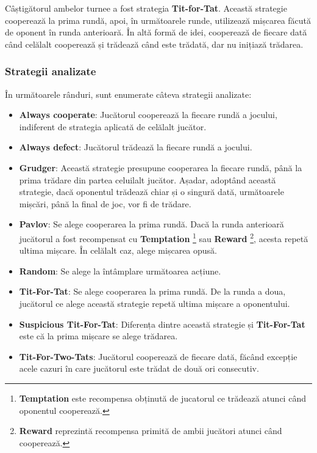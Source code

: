 Câștigătorul ambelor turnee a fost strategia \textbf{Tit-for-Tat}. Această strategie cooperează la prima rundă, apoi, în următoarele runde, utilizează mișcarea făcută de oponent în runda anterioară. În altă formă de idei, cooperează de fiecare dată când celălalt cooperează și trădează când este trădată, dar nu inițiază trădarea.

\clearpage

\subsubsection{Strategii analizate}

În următoarele rânduri, sunt enumerate câteva strategii analizate:

\begin{itemize}  
	\item \textbf{Always cooperate}: Jucătorul cooperează la fiecare rundă a jocului, indiferent de strategia aplicată de celălalt jucător. 
	\item \textbf{Always defect}: Jucătorul trădează la fiecare rundă a jocului. 
	\item \textbf{Grudger}: Această strategie presupune cooperarea la fiecare rundă, până la prima trădare din partea celuilalt jucător. Așadar, adoptând această strategie, dacă oponentul trădează chiar și o singură dată, următoarele mișcări, până la final de joc, vor fi de trădare. 
	\item \textbf{Pavlov}: Se alege cooperarea la prima rundă. Dacă la runda anterioară jucătorul a fost recompensat cu \textbf{Temptation} \footnote{\textbf{Temptation} este recompensa obținută de jucatorul ce trădează atunci când oponentul cooperează.} sau \textbf{Reward} \footnote{\textbf{Reward} reprezintă recompensa primită de ambii jucători atunci când cooperează.}, acesta repetă ultima mișcare. În celălalt caz, alege mișcarea opusă. 
	\item \textbf{Random}: Se alege la întâmplare următoarea acțiune. 
	\item \textbf{Tit-For-Tat}: Se alege cooperarea la prima rundă. De la runda a doua, jucătorul ce alege această strategie repetă ultima mișcare a oponentului. 
	\item \textbf{Suspicious Tit-For-Tat}: Diferența dintre această strategie și \textbf{Tit-For-Tat} este că la prima mișcare se alege trădarea. 
	\item \textbf{Tit-For-Two-Tats}:  Jucătorul cooperează de fiecare dată, făcând excepție acele cazuri în care jucătorul este trădat de două ori consecutiv. 
\end{itemize}  


